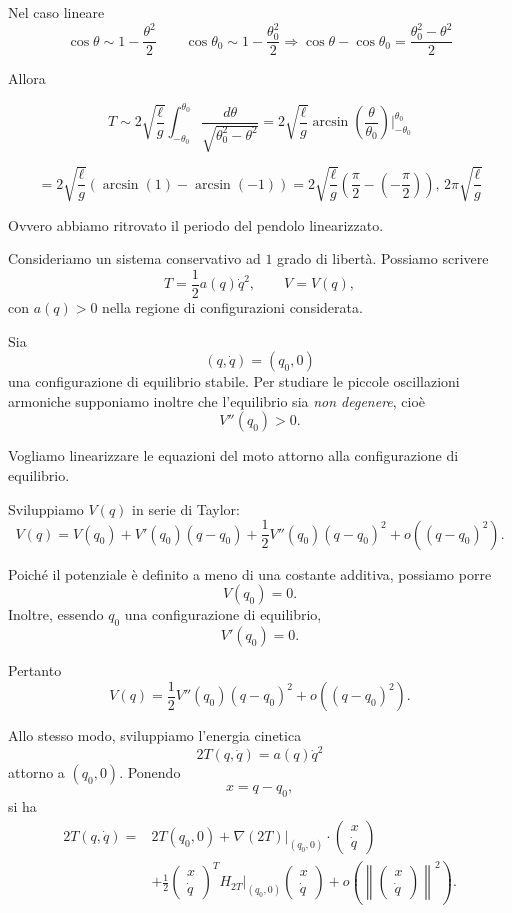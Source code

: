 \begin{example}{}
Nel caso lineare
\[
\cos\theta\sim 1-\frac{\theta^2}{2}
\qquad
\cos\theta_0\sim 1-\frac{\theta_0^2}{2}
\Rightarrow
\cos\theta-\cos\theta_0=\frac{\theta_0^2-\theta^2}{2}
\]

Allora

\[
T
\sim
2\sqrt{\frac{\ell}{g}}
\int_{-\theta_0}^{\theta_0}
\frac{d\theta}{\sqrt{\theta_0^2-\theta^2}}
=
2\sqrt{\frac{\ell}{g}}
\arcsin\left(\frac{\theta}{\theta_0}\right)\Big|_{-\theta_0}^{\theta_0}
\]

\[
=
2\sqrt{\frac{\ell}{g}}
\left(\arcsin(1)-\arcsin(-1)\right)
=
2\sqrt{\frac{\ell}{g}}
\left(\frac{\pi}{2}-\left(-\frac{\pi}{2}\right)\right)
,
\,
2\pi\sqrt{\frac{\ell}{g}}
\]

Ovvero abbiamo ritrovato il periodo del pendolo linearizzato.
\end{example}
Consideriamo un sistema conservativo ad \(1\) grado di libertà. Possiamo scrivere
\[
T=\frac{1}{2}a(q)\dot q^2,
\qquad
V=V(q),
\]
con \(a(q)>0\) nella regione di configurazioni considerata.

Sia
\[
(q,\dot q)=(q_0,0)
\]
una configurazione di equilibrio stabile. Per studiare le piccole oscillazioni armoniche supponiamo inoltre che l'equilibrio sia \emph{non degenere}, cioè
\[
V''(q_0)>0.
\]

Vogliamo linearizzare le equazioni del moto attorno alla configurazione di equilibrio.

Sviluppiamo \(V(q)\) in serie di Taylor:
\[
V(q)
=
V(q_0)
+
V'(q_0)(q-q_0)
+
\frac{1}{2}V''(q_0)(q-q_0)^2
+
o\!\left((q-q_0)^2\right).
\]

Poiché il potenziale è definito a meno di una costante additiva, possiamo porre
\[
V(q_0)=0.
\]
Inoltre, essendo \(q_0\) una configurazione di equilibrio,
\[
V'(q_0)=0.
\]

Pertanto
\[
V(q)
=
\frac{1}{2}V''(q_0)(q-q_0)^2
+
o\!\left((q-q_0)^2\right).
\]

Allo stesso modo, sviluppiamo l'energia cinetica
\[
2T(q,\dot q)=a(q)\dot q^2
\]
attorno a \((q_0,0)\). Ponendo
\[
x=q-q_0,
\]
si ha
\[
\begin{aligned}
2T(q,\dot q)
={}&
2T(q_0,0)
+
\nabla(2T)\big|_{(q_0,0)}
\cdot
\begin{pmatrix}
x\\
\dot q
\end{pmatrix}
\\
&+
\frac{1}{2}
\begin{pmatrix}
x\\
\dot q
\end{pmatrix}^{T}
H_{2T}\big|_{(q_0,0)}
\begin{pmatrix}
x\\
\dot q
\end{pmatrix}
+
o\!\left(
\left\|
\begin{pmatrix}
x\\
\dot q
\end{pmatrix}
\right\|^2
\right).
\end{aligned}
\]

